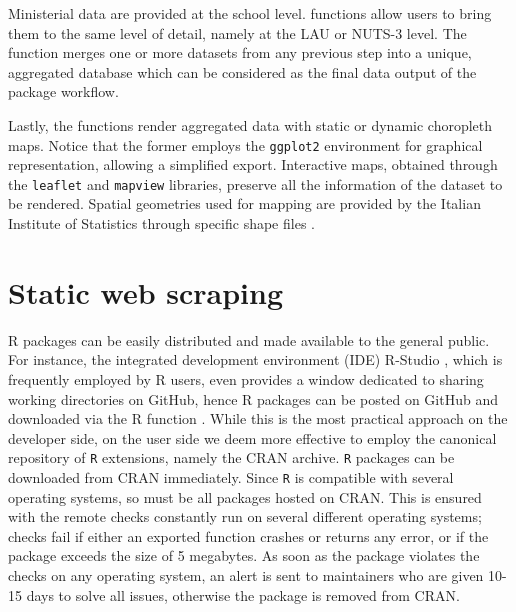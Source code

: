 \documentclass[openany, 11pt, oneside]{book}
\begin{document}
Ministerial data are provided at the school level. \texttt{} functions allow users to bring them to the same level of detail, namely at the LAU or NUTS-3 level. 
The function \texttt{} merges one or more datasets from any previous step into a unique, aggregated database which can be considered as the final data output of the package workflow.

Lastly, the \texttt{} functions render aggregated data with static or dynamic choropleth maps. Notice that the former employs the \texttt{ggplot2} \parencite{ggplot} environment for graphical representation, allowing a simplified export. Interactive maps, obtained through the \texttt{leaflet} \parencite{leaflet} and \texttt{mapview} \parencite{mapview} libraries, preserve all the information of the dataset to be rendered. Spatial geometries used for mapping are provided by the Italian Institute of Statistics through specific shape files \parencite{Shapefiles}.

 
\section{Static web scraping} \label{section:Scraping}
R packages can be easily distributed and made available to the general public. For instance, the integrated development environment (IDE) R-Studio \parencite{RStudio}, which is frequently employed by R users, even provides a window dedicated to sharing working directories on GitHub, hence R packages can be posted on GitHub and downloaded via the R function \texttt{}. While this is the most practical approach on the developer side, on the user side we deem more effective to employ the canonical repository of \texttt{R} extensions, namely the CRAN archive. \texttt{R} packages can be downloaded from CRAN immediately. Since \texttt{R} is compatible with several operating systems, so must be all packages hosted on CRAN. This is ensured with the remote checks \parencite[][Chapter 22]{RPackages} constantly run on several different operating systems; checks fail if either an exported function crashes or returns any error, or if the package exceeds the size of 5 megabytes. As soon as the package violates the checks on any operating system, an alert is sent to maintainers who are given 10-15 days to solve all issues, otherwise the package is removed from CRAN.
\end{document}
